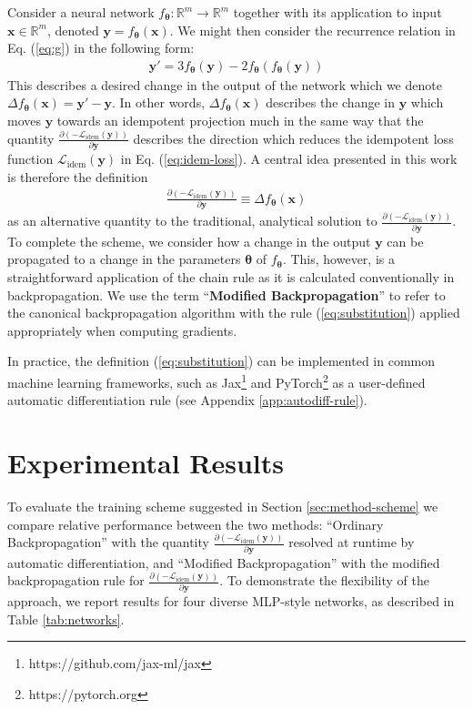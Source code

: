 \documentclass{article}
\theoremstyle{plain}
\theoremstyle{definition}
\theoremstyle{remark}
\newcommand{\vx}{\mathbf{x}}
\newcommand{\vy}{\mathbf{y}}
\newcommand{\vtheta}{\bm{\theta}}
\newcommand{\pd}[2]{\frac{\partial{#1}}{\partial{#2}}}
\begin{document}
Consider a neural network ${f_{\vtheta}: \mathbb{R}^m \to \mathbb{R}^m}$ together with its application to input ${\vx \in \mathbb{R}^m}$, denoted ${\vy = f_{\vtheta}(\vx)}$. We might then consider the recurrence relation in Eq. (\ref{eq:g}) in the following form:
%
\begin{align}
    \vy' = 3f_{\vtheta}(\vy) - 2f_{\vtheta}(f_{\vtheta}(\vy))
\end{align}
%
This describes a desired change in the output of the network which we denote ${\Delta f_{\vtheta}(\vx) = \vy' - \vy}$. In other words, ${\Delta f_{\vtheta}(\vx)}$ describes the change in $\vy$ which moves $\vy$ towards an idempotent projection much in the same way that the quantity $\pd{(-\mathcal{L}_{\mathrm{idem}}(\vy))}{\vy}$ describes the direction which reduces the idempotent loss function $\mathcal{L}_{\mathrm{idem}}(\vy)$ in Eq. (\ref{eq:idem-loss}). A central idea presented in this work is therefore the definition
%
\begin{align}
    \pd{(-\mathcal{L}_{\mathrm{idem}}(\vy))}{\vy} \equiv \Delta f_{\vtheta}(\vx)
    \label{eq:substitution}
\end{align}
%
as an alternative quantity to the traditional, analytical solution to $\pd{(-\mathcal{L}_{\mathrm{idem}}(\vy))}{\vy}$. To complete the scheme, we consider how a change in the output $\vy$ can be propagated to a change in the parameters $\vtheta$ of $f_{\vtheta}$. This, however, is a straightforward application of the chain rule as it is calculated conventionally in backpropagation. We use the term ``\textbf{Modified Backpropagation}'' to refer to the canonical backpropagation algorithm with the rule (\ref{eq:substitution}) applied appropriately when computing gradients.

In practice, the definition (\ref{eq:substitution}) can be implemented in common machine learning frameworks, such as Jax\footnote{https://github.com/jax-ml/jax} and PyTorch\footnote{https://pytorch.org} as a user-defined automatic differentiation rule (see Appendix \ref{app:autodiff-rule}).

\section{Experimental Results}
\label{sec:experiment}
To evaluate the training scheme suggested in Section \ref{sec:method-scheme} we compare relative performance between the two methods: ``Ordinary Backpropagation'' with the quantity $\pd{(-\mathcal{L}_{\mathrm{idem}}(\vy))}{\vy}$ resolved at runtime by automatic differentiation, and ``Modified Backpropagation'' with the modified backpropagation rule for $\pd{(-\mathcal{L}_{\mathrm{idem}}(\vy))}{\vy}$. To demonstrate the flexibility of the approach, we report results for four diverse MLP-style networks, as described in Table \ref{tab:networks}.
\end{document}

